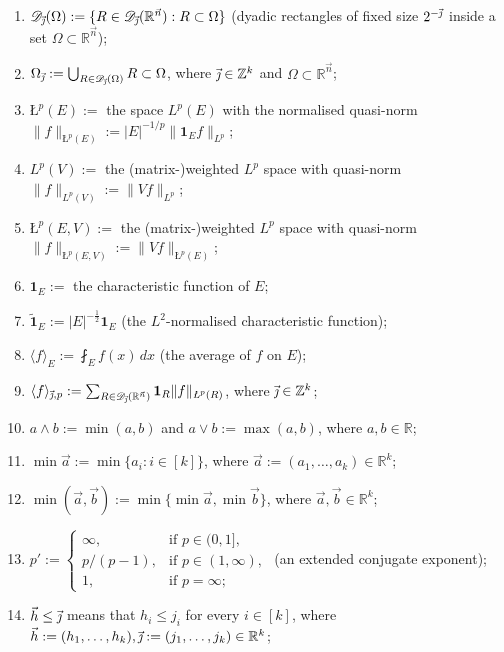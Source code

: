 \documentclass[11pt, reqno]{amsart}
\theoremstyle{definition}
\theoremstyle{remark}
\numberwithin{equation}{section}
\newcommand{\D}{\mathscr D}
\newcommand{\R}{\mathbb R}
\newcommand{\Z}{\mathbb Z}
\newcommand{\va}{\vec a}
\newcommand{\vb}{\vec b}
\newcommand{\vh}{\vec h}
\newcommand{\vj}{\vec{\textit{\j}}}
\newcommand{\vn}{\vec n}
\newcommand{\one}{\mathbf{1}}
\newcommand{\ave}[1]{\langle #1\rangle}
\newcommand{\aveL}{\textit{\L}}
\newcommand{\Ave}[3]{\langle#1\rangle_{#2,#3}}
\newcommand{\abs}[1]{|#1|}
\newcommand{\Norm}[2]{\|#1\|_{#2}}
\begin{document}
\begin{enumerate}[]
\item $\D_{\vj}(\Omega):=\{R\in\D_{\vj}(\R^{\vn}):R\subset\Omega\}$
(dyadic rectangles of fixed size $2^{-\vj}$ inside a set $\Omega\subset\R^{\vn}$);

\item $\Omega_{\vj}:=\bigcup_{R\in\D_{\vj}(\Omega)}^{\phantom{R}}R\subset\Omega$,
where $\vj\in\Z^k$ and $\Omega\subset\R^{\vn}$;

\item $\aveL^p(E):=$ the space $L^p(E)$ with the normalised quasi-norm $\Norm{f}{\aveL^p(E)}:=\abs{E}^{-1/p}\Norm{\one_E f}{L^p}$;

\item $L^p(V):=$ the (matrix-)weighted $L^p$ space with quasi-norm
$\Norm{f}{L^p(V)}:=\Norm{Vf}{L^p}$;

\item $\aveL^p(E,V):=$ the (matrix-)weighted $L^p$ space with
quasi-norm $\Norm{f}{\aveL^p(E,V)}:=\Norm{Vf}{\aveL^p(E)}$;

\item $\mathbf{1}_E:=$ the characteristic function of $E$;

\item $\widetilde{\mathbf{1}}_E:=|E|^{-\frac12}\mathbf{1}_E$ (the $L^2$-normalised characteristic function);

\item $\ave{f}_E:=\fint_E f(x) \,dx$ (the average of $f$ on $E$);

\item $\Ave{f}{\vj}{p}:=\sum_{R\in\D_{\vj}(\R^{\vn})}^{\phantom{R}}\one_R\Norm{f}{\aveL^p(R)}$,
where $\vj\in\Z^k$;

\item $a\wedge b:=\min(a,b)$ and $a\vee b:=\max(a,b)$, where $a,b\in\R$;

\item $\min\va:=\min\{a_i:i\in[k]\}$, where $\va:=(a_1,\ldots,a_k)\in\R^k$;

\item $\min(\va,\vb):=\min\{\min\va,\min\vb\}$, where $\va,\vb\in\R^k$;

\item $p':=\begin{cases}\infty, & \text{if }p\in(0,1], \\ p/(p-1),
& \text{if }p\in(1,\infty), \\ 1, &\text{if }p=\infty; \end{cases}$
(an extended conjugate exponent);

\item $\vh\leq\vj$ means that $h_i\leq j_i$ for every $i\in[k]$,
where $\vh:=(h_1,\ldots,h_k),\vj:=(j_1,\ldots,j_k)\in\R^k$;


\end{enumerate}
\end{document}
